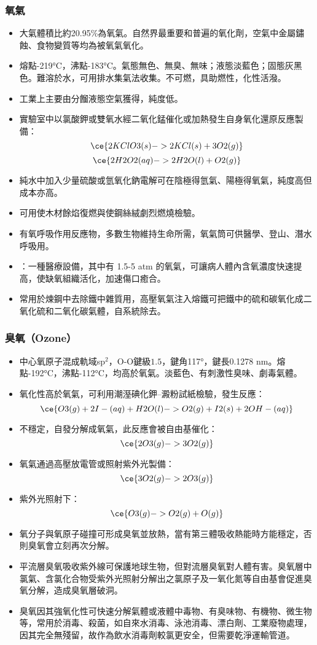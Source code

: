 \documentclass[a4paper,12pt]{report}
\begin{document}
\subsubsection{氧氣}
\begin{itemize}
\item 大氣體積比約20.95\%為氧氣。自然界最重要和普遍的氧化劑，空氣中金屬鏽蝕、食物變質等均為被氧氣氧化。
\item 熔點-219°C，沸點-183°C。氣態無色、無臭、無味；液態淡藍色；固態灰黑色。難溶於水，可用排水集氣法收集。不可燃，具助燃性，化性活潑。
\item 工業上主要由分餾液態空氣獲得，純度低。
\item 實驗室中以氯酸鉀或雙氧水經二氧化錳催化或加熱發生自身氧化還原反應製備：
\[\ce{2KClO3(s) -> 2KCl(s) + 3O2(g)}\]
\[\ce{2H2O2(aq) -> 2H2O(l) + O2(g)}\]
\item 純水中加入少量硫酸或氫氧化鈉電解可在陰極得氫氣、陽極得氧氣，純度高但成本亦高。
\item 可用使木材餘焰復燃與使鋼絲絨劇烈燃燒檢驗。
\item 有氧呼吸作用反應物，多數生物維持生命所需，氧氣筒可供醫學、登山、潛水呼吸用。
\item {}：一種醫療設備，其中有 1.5-5 atm 的氧氣，可讓病人體內含氧濃度快速提高，使缺氧組織活化，加速傷口癒合。
\item 常用於煉鋼中去除鐵中雜質用，高壓氧氣注入熔鐵可把鐵中的硫和碳氧化成二氧化硫和二氧化碳氣體，自系統除去。
\end{itemize}
\subsubsection{臭氧（Ozone）}
\begin{itemize}
\item 中心氧原子混成軌域sp$^2$，O-O鍵級$1.5$，鍵角117°，鍵長0.1278 nm。熔點-192°C，沸點-112°C，均高於氧氣。淡藍色、有刺激性臭味、劇毒氣體。
\item 氧化性高於氧氣，可利用潮溼碘化鉀–澱粉試紙檢驗，發生反應：
\[\ce{O3(g) + 2I-(aq) + H2O(l) -> O2(g) + I2(s) + 2OH-(aq)}\]
\item 不穩定，自發分解成氧氣，此反應會被自由基催化：
\[\ce{2O3(g) -> 3O2(g)}\]
\item 氧氣通過高壓放電管或照射紫外光製備：
\[\ce{3O2(g) -> 2O3(g)}\]
\item 紫外光照射下：
\[\ce{O3(g) -> O2(g) + O(g)}\]
\item 氧分子與氧原子碰撞可形成臭氧並放熱，當有第三體吸收熱能時方能穩定，否則臭氧會立刻再次分解。
\item 平流層臭氧吸收紫外線可保護地球生物，但對流層臭氧對人體有害。臭氧層中氯氣、含氯化合物受紫外光照射分解出之氯原子及一氧化氮等自由基會促進臭氧分解，造成臭氧層破洞。
\item 臭氧因其強氧化性可快速分解氣體或液體中毒物、有臭味物、有機物、微生物等，常用於消毒、殺菌，如自來水消毒、泳池消毒、漂白劑、工業廢物處理，因其完全無殘留，故作為飲水消毒劑較氯更安全，但需要乾淨運輸管道。
\end{itemize}
\end{document}
